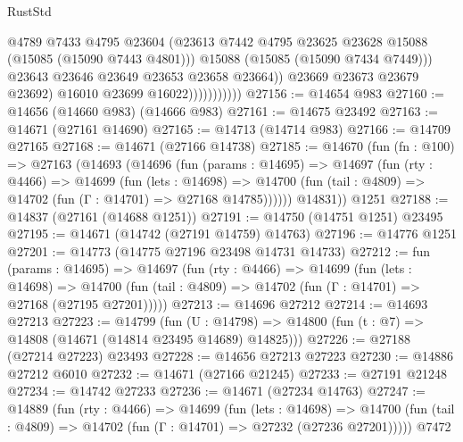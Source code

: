\begin{lexlean}{RustStd}
\begin{coremodule}
                                  @4789
                                  @7433
                                  @4795
                                  @23604
                                  (@23613
                                    @7442
                                    @4795
                                    @23625
                                    @23628
                                    @15088
                                    (@15085 (@15090 @7443 @4801)))
                                  @15088
                                  (@15085 (@15090 @7434 @7449)))
                                @23643
                                @23646
                                @23649
                                @23653
                                @23658
                                @23664))
                            @23669
                            @23673
                            @23679
                            @23692)
                          @16010
                          @23699
                          @16022)))))))))))
@27156 := @14654 @983
@27160 := @14656 (@14660 @983) (@14666 @983)
@27161 := @14675 @23492
@27163 := @14671 (@27161 @14690)
@27165 := @14713 (@14714 @983)
@27166 := @14709 @27165
@27168 := @14671 (@27166 @14738)
@27185 := @14670
    (fun (fn : @100) =>
    @27163
      (@14693
        (@14696
          (fun (params : @14695) =>
          @14697
            (fun (rty : @4466) =>
            @14699
              (fun (lets : @14698) =>
              @14700 (fun (tail : @4809) => @14702 (fun (Γ : @14701) => @27168 @14785))))))
        @14831))
    @1251
@27188 := @14837 (@27161 (@14688 @1251))
@27191 := @14750 (@14751 @1251) @23495
@27195 := @14671 (@14742 (@27191 @14759) @14763)
@27196 := @14776 @1251
@27201 := @14773 (@14775 @27196 @23498 @14731 @14733)
@27212 := fun (params : @14695) =>
  @14697
    (fun (rty : @4466) =>
    @14699
      (fun (lets : @14698) =>
      @14700 (fun (tail : @4809) => @14702 (fun (Γ : @14701) => @27168 (@27195 @27201)))))
@27213 := @14696 @27212
@27214 := @14693 @27213
@27223 := @14799
    (fun (U : @14798) => @14800 (fun (t : @7) => @14808 (@14671 (@14814 @23495 @14689) @14825)))
@27226 := @27188 (@27214 @27223) @23493
@27228 := @14656 @27213 @27223
@27230 := @14886 @27212 @6010
@27232 := @14671 (@27166 @21245)
@27233 := @27191 @21248
@27234 := @14742 @27233
@27236 := @14671 (@27234 @14763)
@27247 := @14889
    (fun (rty : @4466) =>
    @14699
      (fun (lets : @14698) =>
      @14700 (fun (tail : @4809) => @14702 (fun (Γ : @14701) => @27232 (@27236 @27201)))))
    @7472

\end{coremodule}
\end{lexlean}
